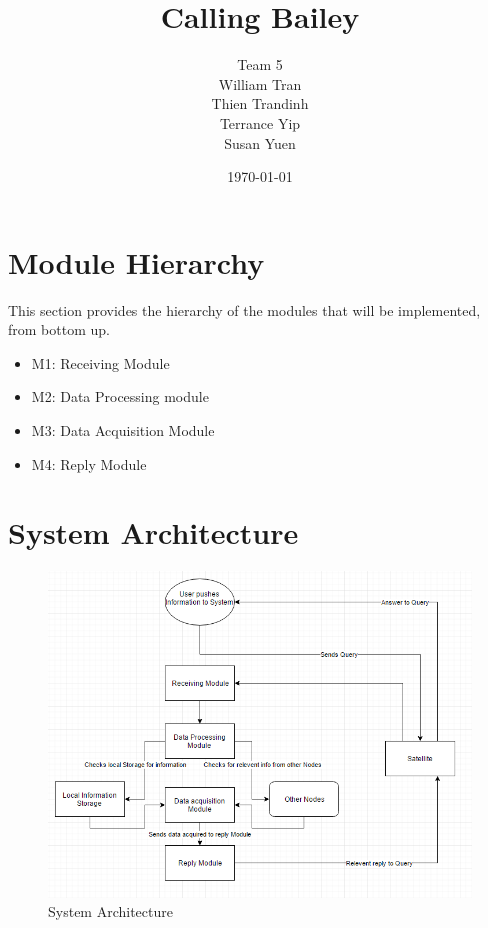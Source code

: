 \documentclass{article}
\title{Calling Bailey}
\author{ Team 5 \\ 
        William Tran \\
		Thien Trandinh \\
		Terrance Yip \\
		Susan Yuen}
\date{\today}
\begin{document}
\maketitle
\newpage
\tableofcontents
\listoffigures

\newpage

% 

\section{Module Hierarchy}
This section provides the hierarchy of the modules that will be implemented, from bottom up.

\begin{itemize}
    \item M1: Receiving Module
    \item M2: Data Processing module
    \item M3: Data Acquisition Module
    \item M4: Reply Module
\end{itemize}

\section{System Architecture}

\begin{figure}[H]
    \includegraphics[width=\linewidth]{model.png}
    \caption {System Architecture}
    \label {fig:system}
\end{figure}
\end{document}
